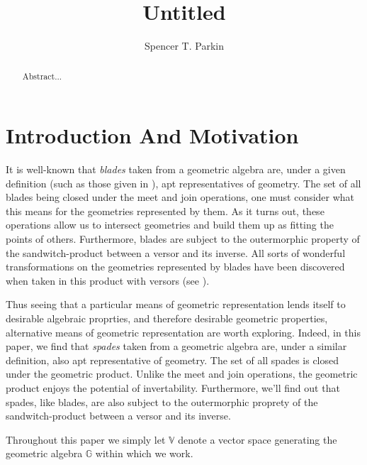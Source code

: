 \documentclass{birkjour}
\theoremstyle{definition}
\theoremstyle{remark}
\numberwithin{equation}{section}
\newcommand{\G}{\mathbb{G}}
\newcommand{\V}{\mathbb{V}}
\begin{document}
\title{Untitled}

\author{Spencer T. Parkin}



\begin{abstract}
Abstract...
\end{abstract}


\maketitle

\section{Introduction And Motivation}

It is well-known that \emph{blades} taken from a geometric algebra are, under a given definition (such as
those given in \cite{Parkin15}), apt representatives of geometry.  The set of all blades being closed under the
meet and join operations, one must consider what this means for the geometries represented by them.
As it turns out, these operations allow us to intersect geometries and build them up as fitting the points of others.
Furthermore, blades are subject to the outermorphic property of the sandwitch-product between a versor and its inverse.
All sorts of wonderful transformations on the geometries represented by blades have been discovered when taken
in this product with versors (see \cite{}).  %

Thus seeing that a particular means of geometric representation lends itself to desirable algebraic proprties, and
therefore desirable geometric properties, alternative means of geometric representation are worth exploring.
Indeed, in this paper, we find that \emph{spades} taken from a geometric algebra are, under a similar definition,
also apt representative of geometry. The set of all spades is closed under the geometric product.  Unlike
the meet and join operations, the geometric product enjoys the potential of invertability.  Furthermore, we'll find
out that spades, like blades, are also subject to the outermorphic proprety of the sandwitch-product between a versor
and its inverse.

Throughout this paper we simply let $\V$ denote a vector space generating the geometric algebra $\G$ within
which we work.
\end{document}
